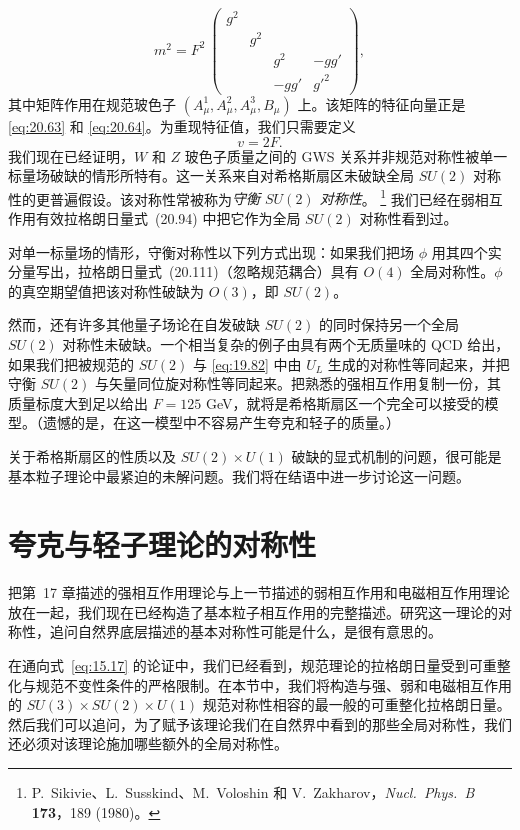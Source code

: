 \begin{equation}
  m^2 = F^2\ \begin{pmatrix}
    g^2 & & & \\
    & g^2 & & \\
    & & g^2 & -gg'\\
    & & -gg' & g'^2
  \end{pmatrix},
  \label{eq:20.124}
\end{equation}
其中矩阵作用在规范玻色子 $(A^1_\mu, A^2_\mu, A^3_\mu, B_\mu)$ 上。该矩阵的特征向量正是 \eqref{eq:20.63} 和 \eqref{eq:20.64}。为重现特征值，我们只需要定义
\begin{equation}
  v = 2F .
  \label{eq:20.125}
\end{equation}
我们现在已经证明，$W$ 和 $Z$ 玻色子质量之间的 GWS 关系并非规范对称性被单一标量场破缺的情形所特有。这一关系来自对希格斯扇区未破缺全局 $SU(2)$ 对称性的更普遍假设。该对称性常被称为\emph{守衡 $SU(2)$ 对称性}。%
\footnote{P.~Sikivie、L.~Susskind、M.~Voloshin 和 V.~Zakharov，\emph{Nucl.\ Phys.\ B} \textbf{173}，189 (1980)。} 我们已经在弱相互作用有效拉格朗日量式~(20.94) 中把它作为全局 $SU(2)$ 对称性看到过。

对单一标量场的情形，守衡对称性以下列方式出现：如果我们把场 $\phi$ 用其四个实分量写出，拉格朗日量式~(20.111)（忽略规范耦合）具有 $O(4)$ 全局对称性。$\phi$ 的真空期望值把该对称性破缺为 $O(3)$，即 $SU(2)$。

然而，还有许多其他量子场论在自发破缺 $SU(2)$ 的同时保持另一个全局 $SU(2)$ 对称性未破缺。一个相当复杂的例子由具有两个无质量味的 QCD 给出，如果我们把被规范的 $SU(2)$ 与 \eqref{eq:19.82} 中由 $U_L$ 生成的对称性等同起来，并把守衡 $SU(2)$ 与矢量同位旋对称性等同起来。把熟悉的强相互作用复制一份，其质量标度大到足以给出 $F = 125$ GeV，就将是希格斯扇区一个完全可以接受的模型。（遗憾的是，在这一模型中不容易产生夸克和轻子的质量。）

关于希格斯扇区的性质以及 $SU(2)\times U(1)$ 破缺的显式机制的问题，很可能是基本粒子理论中最紧迫的未解问题。我们将在结语中进一步讨论这一问题。

\section{夸克与轻子理论的对称性}

把第~17 章描述的强相互作用理论与上一节描述的弱相互作用和电磁相互作用理论放在一起，我们现在已经构造了基本粒子相互作用的完整描述。研究这一理论的对称性，追问自然界底层描述的基本对称性可能是什么，是很有意思的。

在通向式~\eqref{eq:15.17} 的论证中，我们已经看到，规范理论的拉格朗日量受到可重整化与规范不变性条件的严格限制。在本节中，我们将构造与强、弱和电磁相互作用的 $SU(3)\times SU(2)\times U(1)$ 规范对称性相容的最一般的可重整化拉格朗日量。然后我们可以追问，为了赋予该理论我们在自然界中看到的那些全局对称性，我们还必须对该理论施加哪些额外的全局对称性。


